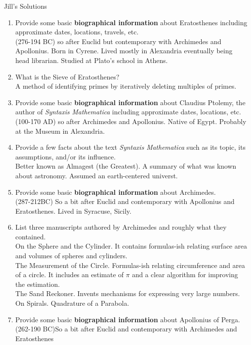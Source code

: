 \documentclass[12pt]{article}
\begin{document}
Jill's Solutions

\begin{enumerate}
\item Provide some basic \textbf{biographical information} about Eratosthenes including approximate dates, locations, travels, etc.\\

(276-194 BC) so after Euclid but contemporary with Archimedes and Apollonius. Born in Cyrene. Lived mostly in Alexandria eventually being head librarian. Studied at Plato's school in Athens.
\vfill
\item What is the Sieve of Eratosthenes?\\

A method of identifying primes by iteratively deleting multiples of primes.\\
\vfill
\item Provide some basic \textbf{biographical information} about Claudius Ptolemy, the author of \textit{Syntaxis Mathematica} including approximate dates, locations, etc.\\

(100-170 AD) so after Archimedes and Apollonius. Native of Egypt. Probably at the Museum in Alexandria.
\vfill
\item Provide a few facts about the text \textit{Syntaxis Mathematica} such as its topic, its assumptions, and/or its influence.\\

Better known as Almagest (the Greatest). A summary of what was known about astronomy. Assumed an earth-centered universt.
\vfill
\item Provide some basic \textbf{biographical information} about Archimedes.\\

(287-212BC) So a bit after Euclid and contemporary with Apollonius and Eratosthenes. Lived in Syracuse, Sicily.
\vfill
\item List three manuscripts authored by Archimedes and roughly what they contained.\\

On the Sphere and the Cylinder. It contains formulas-ish relating surface area and volumes of spheres and cylinders.\\
The Measurement of the Circle. Formulas-ish relating circumference and area of a circle. It includes an estimate of $\pi$ and a clear algorithm for improving the estimation.\\
The Sand Reckoner. Invents mechanisms for expressing very large numbers.\\
On Spirals. Quadrature of a Parabola.

\vfill
\item Provide some basic \textbf{biographical information} about Apollonius of Perga.\\

(262-190 BC)So a bit after Euclid and contemporary with Archimedes and Eratosthenes
\vfill
\end{enumerate}
\end{document}
